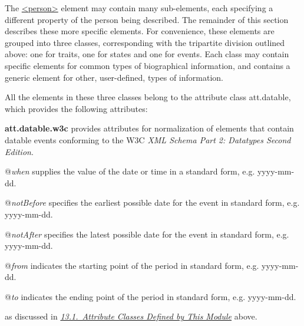 The \hyperref[TEI.person]{<person>} element may contain many sub-elements, each specifying a different property of the person being described. The remainder of this section describes these more specific elements. For convenience, these elements are grouped into three classes, corresponding with the tripartite division outlined above: one for traits, one for states and one for events. Each class may contain specific elements for common types of biographical information, and contains a generic element for other, user-defined, types of information.\par
All the elements in these three classes belong to the attribute class \textsf{att.datable}, which provides the following attributes: 
\begin{sansreflist}
  
\item [\textbf{att.datable.w3c}] provides attributes for normalization of elements that contain datable events conforming to the W3C \textit{XML Schema Part 2: Datatypes Second Edition}.\hfil\\[-10pt]\begin{sansreflist}
    \item[@{\itshape when}]
  supplies the value of the date or time in a standard form, e.g. yyyy-mm-dd.
    \item[@{\itshape notBefore}]
  specifies the earliest possible date for the event in standard form, e.g. yyyy-mm-dd.
    \item[@{\itshape notAfter}]
  specifies the latest possible date for the event in standard form, e.g. yyyy-mm-dd.
    \item[@{\itshape from}]
  indicates the starting point of the period in standard form, e.g. yyyy-mm-dd.
    \item[@{\itshape to}]
  indicates the ending point of the period in standard form, e.g. yyyy-mm-dd.
\end{sansreflist}  
\end{sansreflist}
 as discussed in \textit{\hyperref[NDATTS]{13.1.\ Attribute Classes Defined by This Module}} above.
